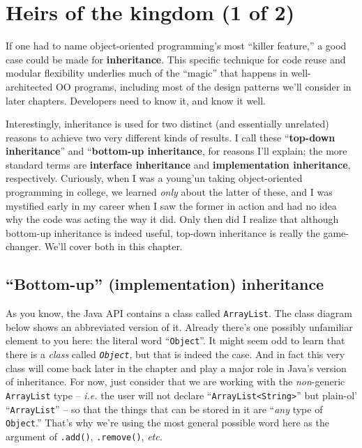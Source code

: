 
\chapter{Heirs of the kingdom (1 of 2)}

If one had to name object-oriented programming's most ``killer feature,'' a
good case could be made for \textbf{inheritance}. This specific technique for
code reuse and modular flexibility underlies much of the ``magic'' that happens
in well-architected OO programs, including most of the design patterns we'll
consider in later chapters. Developers need to know it, and know it well.

Interestingly, inheritance is used for two distinct (and essentially
unrelated) reasons to achieve two very different kinds of results. I call
these ``\textbf{top-down inheritance}'' and ``\textbf{bottom-up inheritance},
for reasons I'll explain; the more standard terms are \textbf{interface
inheritance} and \textbf{implementation inheritance}, respectively. Curiously,
when I was a young'un taking object-oriented programming in college, we
learned \textit{only} about the latter of these, and I was mystified early in
my career when I saw the former in action and had no idea why the code was
acting the way it did. Only then did I realize that although bottom-up
inheritance is indeed useful, top-down inheritance is really the game-changer.
We'll cover both in this chapter.

\section{``Bottom-up'' (implementation) inheritance}

As you know, the Java API contains a class called \texttt{ArrayList}. The
class diagram below shows an abbreviated version of it. Already there's one
possibly unfamiliar element to you here: the literal word ``\texttt{Object}''.
It might seem odd to learn that there is a \textit{class} called
\textit{\texttt{Object}}, but that is indeed the case. And in fact this very
class will come back later in the chapter and play a major role in Java's
version of inheritance. For now, just consider that we are working with the
\textit{non}-generic \texttt{ArrayList} type -- \textit{i.e.} the user will
not declare ``\texttt{ArrayList<String>}'' but plain-ol' ``\texttt{ArrayList}''
-- so that the things that can be stored in it are ``\textit{any} type of
\texttt{Object}.'' That's why we're using the most general possible word here
as the argument of \texttt{.add()}, \texttt{.remove()}, \textit{etc.}

